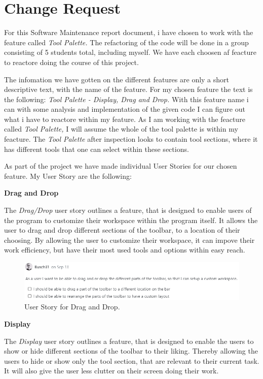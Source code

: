 \section{Change Request}
For this Software Maintenance report document, i have chosen to work with the feature called \textit{Tool Palette.}
The refactoring of the code will be done in a group consisting of 5 students total, including myself. We have each choosen af feacture to reactore doing the course of this project.

The infomation we have gotten on the different features are only a short descriptive text, with the name of the feature. For my chosen feature the text is the following: \textit{Tool Palette - Display, Drag and Drop.}
With this feature name i can with some analysis and implementation of the given code I can figure out what i have to reactore within my feature.
As I am working with the feacture called \textit{Tool Palette,} I will assume the whole of the tool palette is within my feacture. The \textit{Tool Palette} after inspection looks to contain
tool sections, where it has different tools that one can select within these sections.

As part of the project we have made individual User Stories for our chosen feature. My User Story are the following:

\textbf{Drag and Drop}

The \textit{Drag/Drop} user story outlines a feature, that is designed to enable users of the program to customize their workspace within the program itself.
It allows the user to drag and drop different sections of the toolbar, to a location of their choosing.
By allowing the user to customize their workspace, it can impove their work efficiency, but have their most used tools and options within easy reach.

\begin{figure}[htbp]
    \centering
    \includegraphics[width=\linewidth]{pic/Tool_palette_Drag_and_drop.png}
    \caption{User Story for Drag and Drop.}
    \label{fig:tool-palette-drag-drop}
\end{figure}

\textbf{Display}

The \textit{Display} user story outlines a feature, that is designed to enable the users to show or hide different sections of the toolbar to their liking.
Thereby allowing the users to hide or show only the tool section, that are relevant to their current task. It will also give the user less clutter on their screen doing their work.


